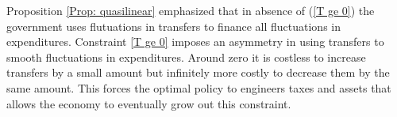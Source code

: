 \documentclass[thmsb,11pt]{article}
\begin{document}
Proposition \ref{Prop: quasilinear} emphasized that in absence of (\ref{T ge 0}) the government uses flutuations in transfers to finance all fluctuations in expenditures.  Constraint \ref{T ge 0} imposes an asymmetry in using transfers to smooth fluctuations in expenditures. Around zero it is costless to increase transfers by a small amount but infinitely more costly to decrease them by the same amount. This forces the optimal policy to engineers taxes and assets that allows the economy to eventually grow out this constraint. 
% 
% 
% 
% 
\end{document}
